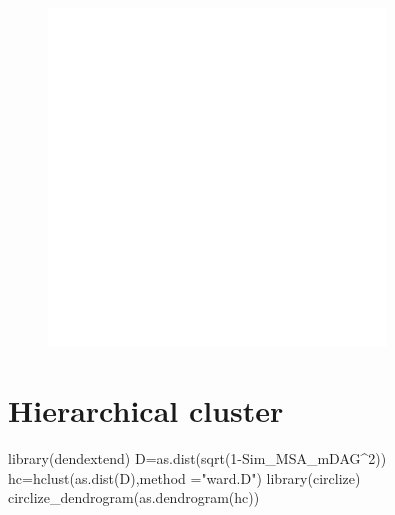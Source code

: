 \documentclass[
  letterpaper,
  DIV=11,
  numbers=noendperiod]{scrreprt}
\newenvironment{Shaded}{\begin{snugshade}}{\end{snugshade}}
\newcommand{\AttributeTok}[1]{\textcolor[rgb]{0.40,0.45,0.13}{#1}}
\newcommand{\DecValTok}[1]{\textcolor[rgb]{0.68,0.00,0.00}{#1}}
\newcommand{\FunctionTok}[1]{\textcolor[rgb]{0.28,0.35,0.67}{#1}}
\newcommand{\NormalTok}[1]{\textcolor[rgb]{0.00,0.23,0.31}{#1}}
\newcommand{\OtherTok}[1]{\textcolor[rgb]{0.00,0.23,0.31}{#1}}
\newcommand{\SpecialCharTok}[1]{\textcolor[rgb]{0.37,0.37,0.37}{#1}}
\newcommand{\StringTok}[1]{\textcolor[rgb]{0.13,0.47,0.30}{#1}}
\begin{document}
\begin{figure}

{\centering \includegraphics[width=0.8\textwidth,height=\textheight]{figures/fig1.jpeg}

}

\end{figure}


\hypertarget{hierarchical-cluster}{%
\chapter*{Hierarchical cluster}\label{hierarchical-cluster}}


\begin{Shaded}
\begin{Highlighting}[]
\FunctionTok{library}\NormalTok{(dendextend)}
\NormalTok{D}\OtherTok{=}\FunctionTok{as.dist}\NormalTok{(}\FunctionTok{sqrt}\NormalTok{(}\DecValTok{1}\SpecialCharTok{{-}}\NormalTok{Sim\_MSA\_mDAG}\SpecialCharTok{\^{}}\DecValTok{2}\NormalTok{))}
\NormalTok{hc}\OtherTok{=}\FunctionTok{hclust}\NormalTok{(}\FunctionTok{as.dist}\NormalTok{(D),}\AttributeTok{method =}\StringTok{"ward.D"}\NormalTok{)}
\FunctionTok{library}\NormalTok{(circlize)}
\FunctionTok{circlize\_dendrogram}\NormalTok{(}\FunctionTok{as.dendrogram}\NormalTok{(hc))}
\end{Highlighting}
\end{Shaded}
\end{document}
